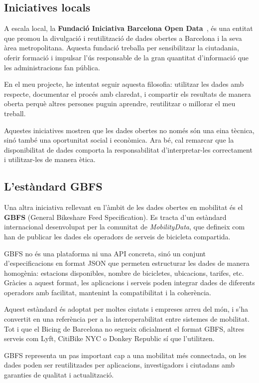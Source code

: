 \subsection{Iniciatives locals}

A escala local, la \textbf{Fundació Iniciativa Barcelona Open Data}~\cite{iniciativa-opendata}, és una entitat que promou la divulgació i reutilització de dades obertes a Barcelona i la seva àrea metropolitana.
Aquesta fundació treballa per sensibilitzar la ciutadania, oferir formació i impulsar l’ús responsable de la gran quantitat d’informació que les administracions fan pública.

En el meu projecte, he intentat seguir aquesta filosofia: utilitzar les dades amb respecte, documentar el procés amb claredat, i compartir els resultats de manera oberta perquè altres persones puguin aprendre, reutilitzar o millorar el meu treball.

Aquestes iniciatives mostren que les dades obertes no només són una eina tècnica,
sinó també una oportunitat social i econòmica. Ara bé, cal remarcar que la disponibilitat de dades
comporta la responsabilitat d’interpretar-les correctament i utilitzar-les de manera ètica.

\subsection{L’estàndard GBFS}
Una altra iniciativa rellevant en l’àmbit de les dades obertes en mobilitat és el \textbf{GBFS} (General Bikeshare Feed Specification)\cite{gbfs}.
Es tracta d’un estàndard internacional desenvolupat per la comunitat de \emph{MobilityData}, que defineix com han de publicar les dades els operadors de serveis de bicicleta compartida.

GBFS no és una plataforma ni una API concreta, sinó un conjunt d'especificacions en format JSON que permeten estructurar les dades de manera homogènia: estacions disponibles, nombre de bicicletes, ubicacions, tarifes, etc.
Gràcies a aquest format, les aplicacions i serveis poden integrar dades de diferents operadors amb facilitat, mantenint la compatibilitat i la coherència.

Aquest estàndard és adoptat per moltes ciutats i empreses arreu del món, i s’ha convertit en una referència per a la interoperabilitat entre sistemes de mobilitat.
Tot i que el Bicing de Barcelona no segueix oficialment el format GBFS, altres serveis com Lyft, CitiBike NYC o Donkey Republic sí que l’utilitzen.

GBFS representa un pas important cap a una mobilitat més connectada, on les dades poden ser reutilitzades per aplicacions, investigadors i ciutadans amb garanties de qualitat i actualització.

